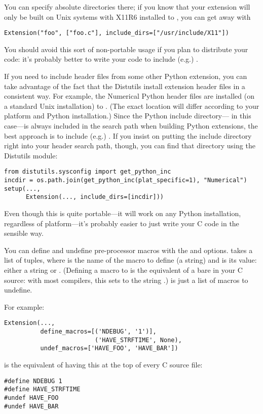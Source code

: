\documentclass{howto}
\begin{document}
You can specify absolute directories there; if you know that your
extension will only be built on Unix systems with X11R6 installed to
, you can get away with
\begin{verbatim}
Extension("foo", ["foo.c"], include_dirs=["/usr/include/X11"])
\end{verbatim}
You should avoid this sort of non-portable usage if you plan to
distribute your code: it's probably better to write your code to include
(e.g.) .

If you need to include header files from some other Python extension,
you can take advantage of the fact that the Distutils install extension
header files in a consistent way.  For example, the Numerical Python
header files are installed (on a standard Unix installation) to
.  (The exact location will
differ according to your platform and Python installation.)  Since the
Python include directory--- in this
case---is always included in the search path when building Python
extensions, the best approach is to include (e.g.)
.  If you insist on putting the
 include directory right into your header search path,
though, you can find that directory using the Distutils
 module:
\begin{verbatim}
from distutils.sysconfig import get_python_inc
incdir = os.path.join(get_python_inc(plat_specific=1), "Numerical")
setup(...,
      Extension(..., include_dirs=[incdir]))
\end{verbatim}
Even though this is quite portable---it will work on any Python
installation, regardless of platform---it's probably easier to just
write your C code in the sensible way.

You can define and undefine pre-processor macros with the
 and  options.
 takes a list of  tuples, where
 is the name of the macro to define (a string) and
 is its value: either a string or .  (Defining a
macro  to  is the equivalent of a bare
 in your C source: with most compilers, this sets
 to the string .)   is just
a list of macros to undefine.

For example:
\begin{verbatim}
Extension(...,
          define_macros=[('NDEBUG', '1')],
                         ('HAVE_STRFTIME', None),
          undef_macros=['HAVE_FOO', 'HAVE_BAR'])
\end{verbatim}
is the equivalent of having this at the top of every C source file:
\begin{verbatim}
#define NDEBUG 1
#define HAVE_STRFTIME
#undef HAVE_FOO
#undef HAVE_BAR
\end{verbatim}
\end{document}
